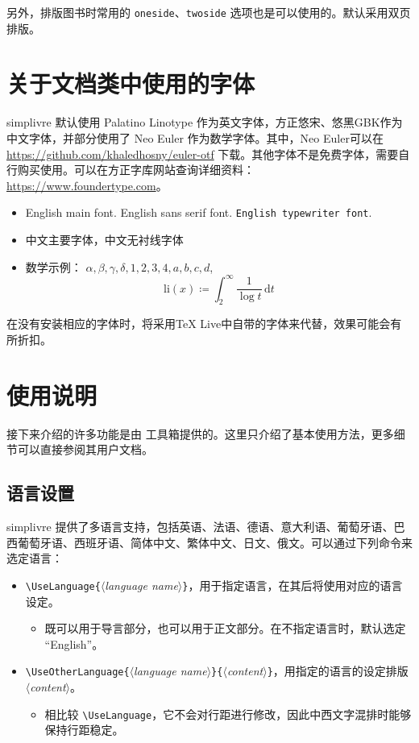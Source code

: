 \documentclass[puretext]{simplivre}
\providecommand{\meta}[1]{$\langle${\normalfont\itshape#1}$\rangle$}
\newenvironment{tip}[1][提示]{%
    \LocallyStopLineNumbers%
    \begin{tcolorbox}[breakable,
        enhanced,
        width = \textwidth,
        colback = white, colbacktitle = paper,
        colframe = gray!50, boxrule=0.2mm,
        coltitle = black,
        fonttitle = \sffamily,
        attach boxed title to top left = {yshift=-\tcboxedtitleheight/2,  xshift=\tcboxedtitlewidth/4},
        boxed title style = {boxrule=0pt, colframe=paper},
        before skip = 0.3cm,
        after skip = 0.3cm,
        top = 3mm,
        bottom = 3mm,
        title={\sffamily #1}]%
}{\end{tcolorbox}\ResumeLineNumbers}
\providecommand{\simplivre}{\textsf{simplivre}}
\begin{document}
\bigskip
另外，排版图书时常用的 \texttt{oneside}、\texttt{twoside} 选项也是可以使用的。默认采用双页排版。

\chapter{关于文档类中使用的字体}
\simplivre{} 默认使用 Palatino Linotype 作为英文字体，方正悠宋、悠黑GBK作为中文字体，并部分使用了 Neo Euler 作为数学字体。其中，Neo Euler可以在 \url{https://github.com/khaledhosny/euler-otf} 下载。其他字体不是免费字体，需要自行购买使用。可以在方正字库网站查询详细资料：\url{https://www.foundertype.com}。

\begin{tip}[字体演示]
    \begin{itemize}
        \item English main font. \textsf{English sans serif font}. \texttt{English typewriter font}.
        \item 中文主要字体，\textsf{中文无衬线字体}
        \item 数学示例： \( \alpha, \beta, \gamma, \delta, 1,2,3,4, a,b,c,d \), \[\mathrm{li}(x)\coloneqq \int_2^{\infty} \frac{1}{\log t}\,\mathrm{d}t \]
    \end{itemize}
\end{tip}

\bigskip
在没有安装相应的字体时，将采用TeX Live中自带的字体来代替，效果可能会有所折扣。


\chapter{使用说明}

\vspace{-\baselineskip}

接下来介绍的许多功能是由 \ProjLib{} 工具箱提供的。这里只介绍了基本使用方法，更多细节可以直接参阅其用户文档。

\section{语言设置}

\simplivre{} 提供了多语言支持，包括英语、法语、德语、意大利语、葡萄牙语、巴西葡萄牙语、西班牙语、简体中文、繁体中文、日文、俄文。可以通过下列命令来选定语言：
\begin{itemize}
    \item \lstinline|\UseLanguage{|\meta{language name}\lstinline|}|，用于指定语言，在其后将使用对应的语言设定。
    \begin{itemize}
        \item 既可以用于导言部分，也可以用于正文部分。在不指定语言时，默认选定 “English”。
    \end{itemize}
    \item \lstinline|\UseOtherLanguage{|\meta{language name}\lstinline|}{|\meta{content}\lstinline|}|，用指定的语言的设定排版 \meta{content}。
    \begin{itemize}
        \item 相比较 \lstinline|\UseLanguage|，它不会对行距进行修改，因此中西文字混排时能够保持行距稳定。
    \end{itemize}
\end{itemize}
\end{document}
